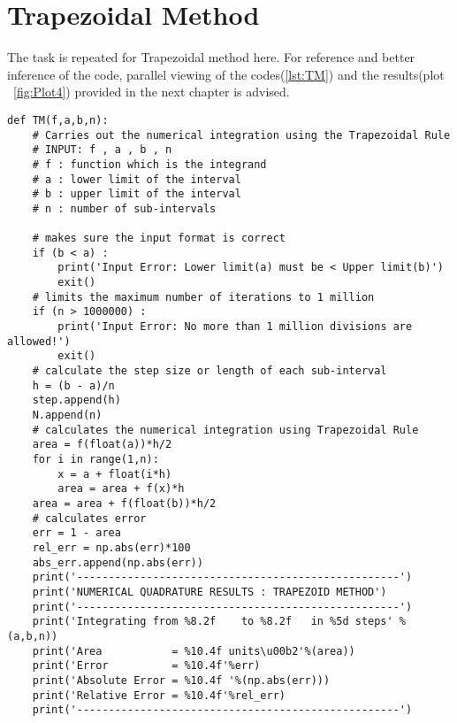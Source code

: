 \documentclass[a4paper, 12pt]{report}
\begin{document}
\section{Trapezoidal Method}
The task is repeated for Trapezoidal method here. For reference and better inference of the code, parallel viewing of the codes(\ref{lst:TM}) and the results(plot ~\ref{fig:Plot4}) provided in the next chapter is advised.
\begin{lstlisting}
def TM(f,a,b,n):
    # Carries out the numerical integration using the Trapezoidal Rule
    # INPUT: f , a , b , n
    # f : function which is the integrand
    # a : lower limit of the interval
    # b : upper limit of the interval
    # n : number of sub-intervals

    # makes sure the input format is correct
    if (b < a) :
        print('Input Error: Lower limit(a) must be < Upper limit(b)')
        exit()
    # limits the maximum number of iterations to 1 million
    if (n > 1000000) :
        print('Input Error: No more than 1 million divisions are allowed!')
        exit()
    # calculate the step size or length of each sub-interval
    h = (b - a)/n
    step.append(h)
    N.append(n)
    # calculates the numerical integration using Trapezoidal Rule
    area = f(float(a))*h/2
    for i in range(1,n):
        x = a + float(i*h)
        area = area + f(x)*h
    area = area + f(float(b))*h/2
    # calculates error
    err = 1 - area
    rel_err = np.abs(err)*100
    abs_err.append(np.abs(err))
    print('---------------------------------------------------')
    print('NUMERICAL QUADRATURE RESULTS : TRAPEZOID METHOD')
    print('---------------------------------------------------')
    print('Integrating from %8.2f    to %8.2f   in %5d steps' %(a,b,n))
    print('Area           = %10.4f units\u00b2'%(area))
    print('Error          = %10.4f'%err)
    print('Absolute Error = %10.4f '%(np.abs(err)))
    print('Relative Error = %10.4f'%rel_err)
    print('---------------------------------------------------')
\end{lstlisting}    
\end{document}
